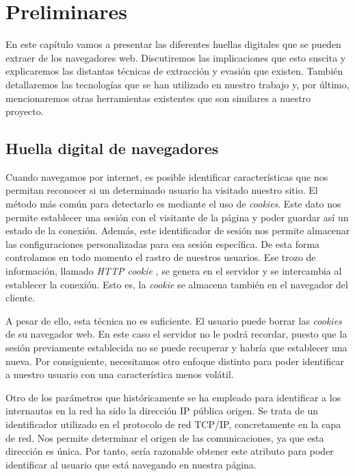 \chapter{Preliminares}
\label{ch:preliminares}
En este capítulo vamos a presentar las diferentes huellas digitales que se pueden extraer de los navegadores web. Discutiremos las implicaciones que esto suscita y explicaremos las distantas técnicas de extracción y evasión que existen. También detallaremos las tecnologías que se han utilizado en nuestro trabajo y, por último, mencionaremos otras herramientas existentes que son similares a nuestro proyecto.

\section{Huella digital de navegadores}
Cuando navegamos por internet, es posible identificar características que nos permitan reconocer si un determinado usuario ha visitado nuestro sitio. El método más común para detectarlo es mediante el uso de \textit{cookies}. Este dato nos permite establecer una sesión con el visitante de la página y poder guardar así un estado de la conexión. Además, este identificador de sesión nos permite almacenar las configuraciones personalizadas para esa sesión específica. De esta forma controlamos en todo momento el rastro de nuestros usuarios. Ese trozo de información, llamado \textit{HTTP cookie} \cite{rfc6265}, se genera en el servidor y se intercambia al establecer la conexión. Esto es, la \textit{cookie} se almacena también en el navegador del cliente. \par

A pesar de ello, esta técnica no es suficiente. El usuario puede borrar las \textit{cookies} de su navegador web. En este caso el servidor no le podrá recordar, puesto que la sesión previamente establecida no se puede recuperar y habría que establecer una nueva. Por consiguiente, necesitamos otro enfoque distinto para poder identificar a nuestro usuario con una característica menos volátil. \par

Otro de los parámetros que históricamente se ha empleado para identificar a los internautas en la red ha sido la dirección IP pública origen. Se trata de un identificador utilizado en el protocolo de red TCP/IP, concretamente en la capa de red. Nos permite determinar el origen de las comunicaciones, ya que esta dirección es única. Por tanto, sería razonable obtener este atributo para poder identificar al usuario que está navegando en nuestra página. \par

